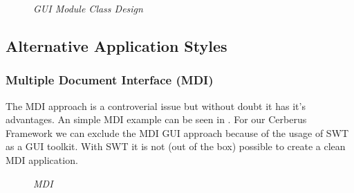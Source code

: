 \begin{figure}[ht]
\centering
{} 
\caption[GUI Module Class Design]{\textit{GUI Module Class Design}} 
\label{gfx:gui_module_class_design}
\end{figure}

\subsection{Alternative Application Styles}

\subsubsection{Multiple Document Interface (MDI)}

The MDI approach is a controverial issue but without doubt it has it's advantages. 
An simple MDI example can be seen in .
For our Cerberus Framework we can exclude the MDI GUI approach because of the usage of SWT as a GUI toolkit.
With SWT it is not (out of the box) possible to create a clean MDI application.

\begin{figure}[ht]
\centering
{} 
\caption[MDI]{\textit{MDI}} 
\label{gfx:mdi}
\end{figure}

